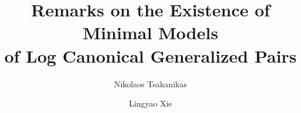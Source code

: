 \usepackage[all]{xy}
\usepackage{graphicx}

\usepackage{tikz-cd}
\usetikzlibrary{babel}

\usepackage{hyperref}
\hypersetup{
	colorlinks=true,
	linkcolor=red,
	citecolor=blue}

\theoremstyle{plain}

\newtheorem{thm}{Theorem}[section]
\newtheorem{prop}[thm]{Proposition}
\newtheorem{lem}[thm]{Lemma}
\newtheorem{cor}[thm]{Corollary}

\theoremstyle{definition}

\newtheorem{dfn}[thm]{Definition}
\newtheorem{rem}[thm]{Remark}
\newtheorem{exa}[thm]{Example}
\newtheorem{notation}[thm]{Notation}

\theoremstyle{plain}

\newtheorem{thmA}{Theorem}
\renewcommand{\thethmA}{\Alph{thmA}}
\newtheorem{corA}[thmA]{Corollary}


\newcommand{\N}{\mathbb{N}}
\newcommand{\Z}{\mathbb{Z}}
\newcommand{\Q}{\mathbb{Q}}
\newcommand{\R}{\mathbb{R}}
\newcommand{\C}{\mathbb{C}}
\newcommand{\K}{\mathbb{K}}

\newcommand{\OO}{\mathcal{O}}

\DeclareMathOperator{\codim}{codim}
\DeclareMathOperator{\Exc}{Exc}
\DeclareMathOperator{\mult}{mult}
\DeclareMathOperator{\Supp}{Supp}
\DeclareMathOperator{\NEb}{\overline{\mathrm{NE}}}
\DeclareMathOperator{\proj}{Proj}
\DeclareMathOperator{\spec}{Spec}
\DeclareMathOperator{\sbs}{\mathbf{B}}


\newcommand{\Ima}{\operatorname{Im}}
\newcommand{\Weil}{\operatorname{Weil}}
\newcommand{\Div}{\operatorname{Div}}




	
	\title[Remarks on the Existence of Minimal Models]{Remarks on the Existence of Minimal Models \\ of Log Canonical Generalized Pairs}
	
	\author[Nikolaos Tsakanikas]{Nikolaos Tsakanikas}
	\address{Max Planck Institute for Mathematics, Vivatsgasse 7, 53111 Bonn, Germany}
	
	\author[Lingyao Xie]{Lingyao Xie}
	\address{Department of Mathematics, The University of Utah, Salt Lake City, UT 84112, USA}
	
